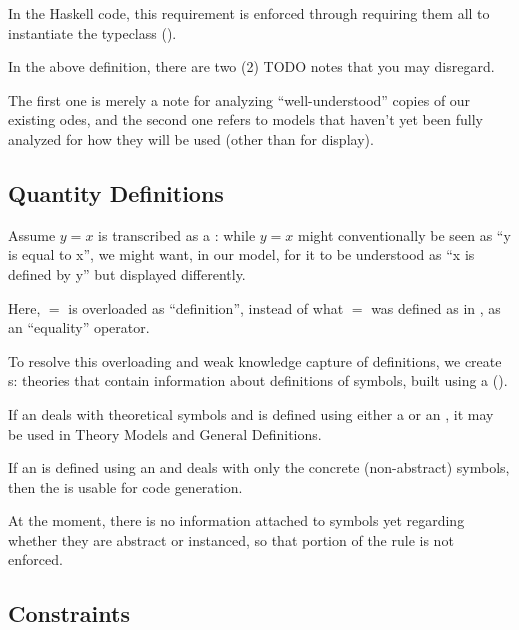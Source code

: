 In the Haskell code, this requirement is enforced through requiring them all to
instantiate the \Express{} typeclass ().

\currentModelKindsHaskell{}

In the above \ModelKinds{} definition, there are two (2) TODO notes that you may
disregard.

The first one is merely a note for analyzing ``well-understood'' copies of our
existing \acsp{ode}, and the second one refers to models that haven't yet been
fully analyzed for how they will be used (other than for display).

\subsection{Quantity Definitions}

\currentQDefinitionHaskell{}

Assume \(y = x\) is transcribed as a \RelationConcept{}: while \(y = x\) might
conventionally be seen as ``y is equal to x'', we might want, in our model, for
it to be understood as ``x is defined by y'' but displayed differently.

Here, \(=\) is overloaded as ``definition'', instead of what \(=\) was defined
as in \Expr{}, as an ``equality'' operator.

To resolve this overloading and weak knowledge capture of definitions, we create
\EquationalModel{}s: theories that contain information about definitions of
symbols, built using a \QDefinition{} ().

If an \EquationalModel{} deals with theoretical symbols and is defined using
either a \ModelExpr{} or an \Expr{}, it may be used in Theory Models and General
Definitions.

If an \EquationalModel{} is defined using an \Expr{} and deals with only the
concrete (non-abstract) symbols, then the \EquationalModel{} is usable for code
generation.

At the moment, there is no information attached to symbols yet regarding whether
they are abstract or instanced, so that portion of the rule is not enforced.


\subsection{Constraints}

